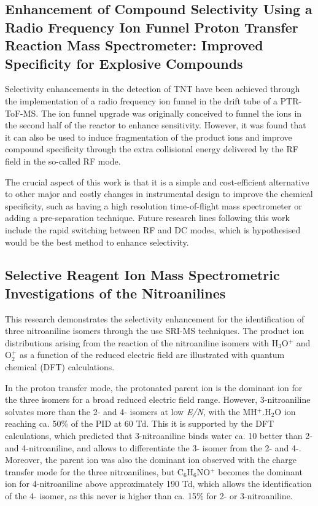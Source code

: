 
\subsection{Enhancement of Compound Selectivity Using a Radio Frequency Ion Funnel Proton Transfer Reaction Mass Spectrometer: Improved Specificity for Explosive Compounds}

Selectivity enhancements in the detection of TNT have been achieved through the implementation of a radio frequency ion funnel in the drift tube of a PTR-ToF-MS.
%
The ion funnel upgrade was originally conceived to funnel the ions in the second half of the reactor to enhance sensitivity.
%
However, it was found that it can also be used to induce fragmentation of the product ions and improve compound specificity through the extra collisional energy delivered by the RF field in the so-called RF mode.


The crucial aspect of this work is that it is a simple and cost-efficient alternative to other major and costly changes in instrumental design to improve the chemical specificity, such as having a high resolution time-of-flight mass spectrometer or adding a pre-separation technique.
%
Future research lines following this work include the rapid switching between RF and DC modes, which is hypothesised would be the best method to enhance selectivity.



\subsection{Selective Reagent Ion Mass Spectrometric Investigations of the Nitroanilines}

This research demonstrates the selectivity enhancement for the identification of three nitroaniline isomers through the use SRI-MS techniques.
%
The product ion distributions arising from the reaction of the nitroaniline isomers with H$_3$O$^+$ and O$_2^+$ as a function of the reduced electric field are illustrated with quantum chemical  (DFT) calculations.

In the proton transfer mode, the protonated parent ion is the dominant ion for the three isomers for a broad reduced electric field range.
%
However, 3-nitroaniline solvates more than the 2- and 4- isomers at low \textit{E/N}, with the MH$^+$.H$_2$O ion reaching ca. 50\% of the PID at 60 Td.
%
This it is supported by the DFT calculations, which predicted that 3-nitroaniline binds water ca. 10 better than 2- and 4-nitroaniline, and allows to differentiate the 3- isomer from the 2- and 4-.
%
Moreover, the parent ion was also the dominant ion observed with the charge transfer mode for the three nitroanilines, but C$_6$H$_6$NO$^+$ becomes the dominant ion for 4-nitroaniline above approximately 190 Td, which allows the identification of the 4- isomer, as this never is higher than ca. 15\% for 2- or 3-nitroaniline.


